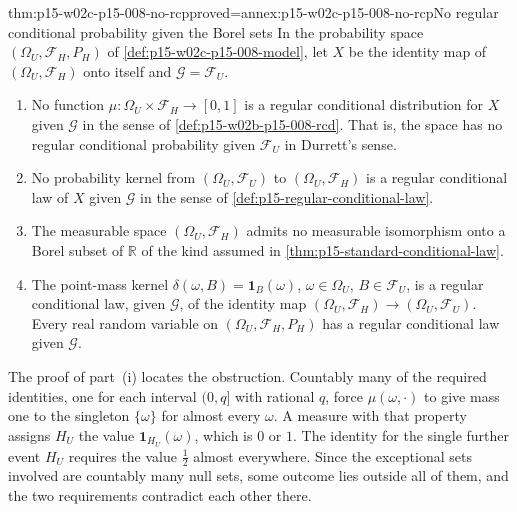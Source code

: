 \begin{hbtheorem}{thm:p15-w02c-p15-008-no-rcp}{proved=annex:p15-w02c-p15-008-no-rcp}{No regular conditional probability given the Borel sets}
In the probability space \((\Omega_U,\mathcal F_H,P_H)\) of
\cref{def:p15-w02c-p15-008-model}, let \(X\) be the identity map of
\((\Omega_U,\mathcal F_H)\) onto itself and \(\mathcal G=\mathcal F_U\).
\begin{enumerate}
\item No function \(\mu:\Omega_U\times\mathcal F_H\to[0,1]\) is a regular
      conditional distribution for \(X\) given \(\mathcal G\) in the sense
      of \cref{def:p15-w02b-p15-008-rcd}. That is, the space has no regular
      conditional probability given \(\mathcal F_U\) in Durrett's sense.
\item No probability kernel from \((\Omega_U,\mathcal F_U)\) to
      \((\Omega_U,\mathcal F_H)\) is a regular conditional law of \(X\)
      given \(\mathcal G\) in the sense of
      \cref{def:p15-regular-conditional-law}.
\item The measurable space \((\Omega_U,\mathcal F_H)\) admits no
      measurable isomorphism onto a Borel subset of \(\mathbb R\) of the
      kind assumed in \cref{thm:p15-standard-conditional-law}.
\item The point-mass kernel \(\delta(\omega,B)=\mathbf1_B(\omega)\),
      \(\omega\in\Omega_U\), \(B\in\mathcal F_U\), is a regular
      conditional law, given \(\mathcal G\), of the identity map
      \((\Omega_U,\mathcal F_H)\to(\Omega_U,\mathcal F_U)\). Every real
      random variable on \((\Omega_U,\mathcal F_H,P_H)\) has a regular
      conditional law given \(\mathcal G\).
\end{enumerate}
\end{hbtheorem}

The proof of part~(i) locates the obstruction. Countably many of the
required identities, one for each interval \((0,q]\) with rational
\(q\), force \(\mu(\omega,\cdot)\) to give mass one to the singleton
\(\{\omega\}\) for almost every \(\omega\). A measure with that property
assigns \(H_U\) the value \(\mathbf1_{H_U}(\omega)\), which is \(0\) or
\(1\). The identity for the single further event \(H_U\) requires the
value \(\tfrac12\) almost everywhere. Since the exceptional sets involved
are countably many null sets, some outcome lies outside all of them, and
the two requirements contradict each other there.

